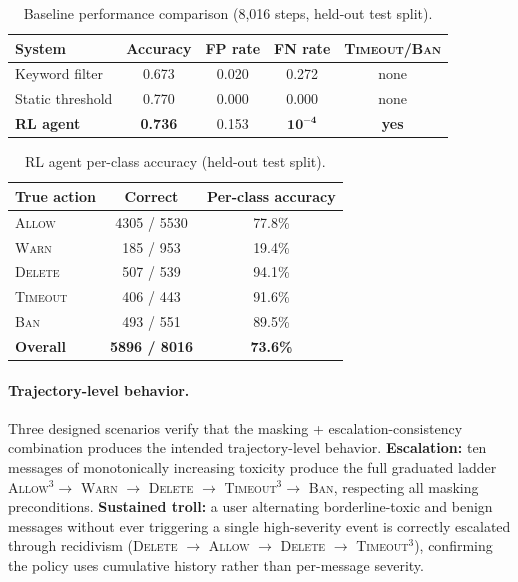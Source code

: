 \documentclass{article}
\begin{document}
\begin{table}[t]
  \caption{Baseline performance comparison (8,016 steps, held-out test split).}
  \label{tab:baseline}
  \centering
  \begin{tabular}{lcccc}
    \toprule
    System & Accuracy & FP rate & FN rate & \textsc{Timeout}/\textsc{Ban} \\
    \midrule
    Keyword filter   & 0.673 & 0.020 & 0.272 & none \\
    Static threshold & 0.770 & 0.000 & 0.000 & none \\
    \textbf{RL agent}& \textbf{0.736} & 0.153 & $\mathbf{10^{-4}}$ & \textbf{yes} \\
    \bottomrule
  \end{tabular}
\end{table}

\begin{table}[t]
  \caption{RL agent per-class accuracy (held-out test split).}
  \label{tab:confusion}
  \centering
  \begin{tabular}{lcc}
    \toprule
    True action & Correct & Per-class accuracy \\
    \midrule
    \textsc{Allow}   & 4305 / 5530 & 77.8\% \\
    \textsc{Warn}    &  185 /  953 & 19.4\% \\
    \textsc{Delete}  &  507 /  539 & 94.1\% \\
    \textsc{Timeout} &  406 /  443 & 91.6\% \\
    \textsc{Ban}     &  493 /  551 & 89.5\% \\
    \midrule
    \textbf{Overall} & \textbf{5896 / 8016} & \textbf{73.6\%} \\
    \bottomrule
  \end{tabular}
\end{table}

\paragraph{Trajectory-level behavior.}
Three designed scenarios verify that the masking + escalation-consistency
combination produces the intended trajectory-level behavior. \textbf{Escalation:}
ten messages of monotonically increasing toxicity produce the full graduated
ladder \textsc{Allow}$^3 \to$ \textsc{Warn} $\to$ \textsc{Delete} $\to$
\textsc{Timeout}$^3 \to$ \textsc{Ban}, respecting all masking preconditions.
\textbf{Sustained troll:} a user alternating borderline-toxic and benign
messages without ever triggering a single high-severity event is correctly
escalated through recidivism (\textsc{Delete} $\to$ \textsc{Allow} $\to$
\textsc{Delete} $\to$ \textsc{Timeout}$^3$), confirming the policy uses
cumulative history rather than per-message severity.
\end{document}
